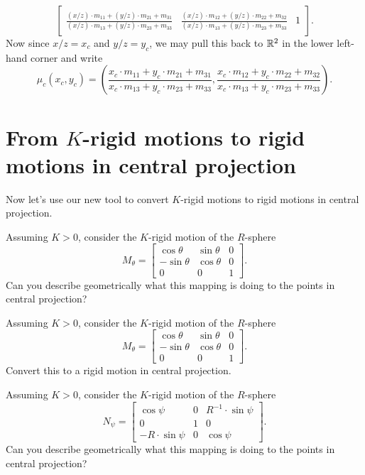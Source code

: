 \documentclass{ximera}
\begin{document}
\begin{problem}
\begin{freeResponse}
    \[
    \begin{bmatrix}
      \frac{(x/z)\cdot m_{11}+(y/z)\cdot m_{21}+m_{31}}{(x/z)\cdot m_{13}+(y/z)\cdot m_{23}+m_{33}}
      &
      \frac{(x/z)\cdot m_{12}+(y/z)\cdot m_{22}+m_{32}}{(x/z)\cdot m_{13}+(y/z)\cdot m_{23}+m_{33}}
      & 1
    \end{bmatrix}.
    \]
    Now since $x/z = x_c$ and $y/z =y_c$, we may pull this back to
    $\mathbb R^2$ in the lower left-hand corner and write
    \[
    \mu_c(x_c,y_c) = \left(
    \frac{x_c\cdot m_{11} + y_c\cdot m_{21} + m_{31}}{x_c\cdot m_{13} + y_c\cdot m_{23} + m_{33}},
    \frac{x_c\cdot m_{12} + y_c\cdot m_{22} + m_{32}}{x_c\cdot m_{13} + y_c\cdot m_{23} + m_{33}}
    \right).
    \]
  \end{freeResponse}
\end{problem}


\section{From $K$-rigid motions to rigid motions in central projection}

Now let's use our new tool to convert $K$-rigid motions to rigid motions in central projection. 



\begin{problem}
  Assuming $K > 0$, consider the $K$-rigid motion of the $R$-sphere
  \[
  M_\theta=
  \begin{bmatrix}
    \cos\theta & \sin\theta & 0\\
    -\sin\theta & \cos\theta & 0\\
    0 & 0 & 1
  \end{bmatrix}.
  \]
  Can you describe geometrically what this mapping is doing to the
  points in central projection?
\end{problem}


\begin{problem}
  Assuming $K > 0$, consider the $K$-rigid motion of the $R$-sphere
  \[
  M_\theta=
  \begin{bmatrix}
    \cos\theta & \sin\theta & 0\\
    -\sin\theta & \cos\theta & 0\\
    0 & 0 & 1
  \end{bmatrix}.
  \]
  Convert this to a rigid motion in central projection.
\end{problem}


\begin{problem}
  Assuming $K > 0$, consider the $K$-rigid motion of the $R$-sphere
  \[
  N_\psi=
  \begin{bmatrix}
    \cos\psi & 0 & R^{-1}\cdot\sin\psi\\
    0 & 1 & 0\\
    -R\cdot\sin\psi & 0 & \cos\psi
  \end{bmatrix}.
  \]
Can you describe geometrically what this mapping is doing to the
points in central projection?  
\end{problem}
\end{document}
